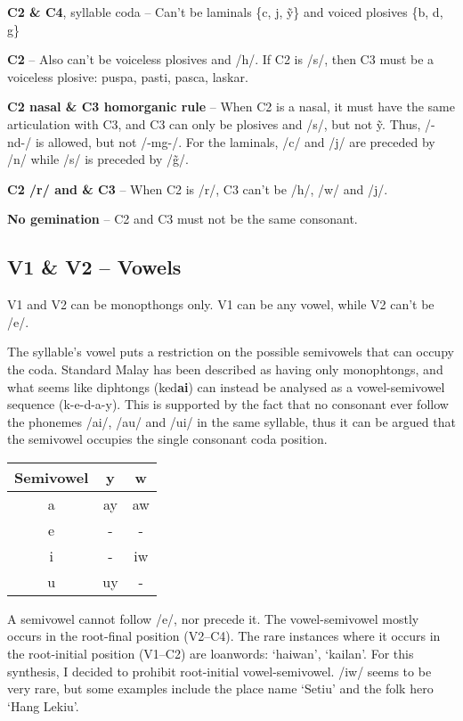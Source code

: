 \documentclass{article}
\begin{document}
\textbf{C2 \& C4}, syllable coda -- Can't be laminals \{c, j, \~y\} and voiced plosives \{b, d, g\}

\textbf{C2} -- Also can't be voiceless plosives and /h/. If C2 is /s/, then C3 must be a voiceless plosive: puspa, pasti, pasca, laskar.

\textbf{C2 nasal \& C3 homorganic rule} -- When C2 is a nasal, it must have the same articulation with C3, and C3 can only be plosives and /s/, but not \~y. Thus, /-nd-/ is allowed, but not /-mg-/. For the laminals, /c/ and /j/ are preceded by /n/ while /s/ is preceded by /\~g/.

\textbf{C2 /r/ and \& C3} -- When C2 is /r/, C3 can't be /h/, /w/ and /j/.

\textbf{No gemination} -- C2 and C3 must not be the same consonant.

\subsection*{V1 \& V2 -- Vowels}

V1 and V2 can be monopthongs only. V1 can be any vowel, while V2 can't be /e/.

The syllable's vowel puts a restriction on the possible semivowels that can occupy the coda. Standard Malay has been described as having only monophtongs, and what seems like diphtongs (ked\textbf{ai}) can instead be analysed as a vowel-semivowel sequence (k-e-d-a-y). This is supported by the fact that no consonant ever follow the phonemes /ai/, /au/ and /ui/ in the same syllable, thus it can be argued that the semivowel occupies the single consonant coda position.

\begin{center}
    \begin{tabular}{c c c}
        \toprule
        Semivowel & y  & w  \\ \midrule
            a     & ay & aw \\
            e     & -  & -  \\
            i     & -  & iw \\
            u     & uy & -  \\ \bottomrule
    \end{tabular}
\end{center}

A semivowel cannot follow /e/, nor precede it. The vowel-semivowel mostly occurs in the root-final position (V2--C4). The rare instances where it occurs in the root-initial position (V1--C2) are loanwords: `haiwan', `kailan'. For this synthesis, I decided to prohibit root-initial vowel-semivowel. /iw/ seems to be very rare, but some examples include the place name `Setiu' and the folk hero `Hang Lekiu'.
\end{document}
